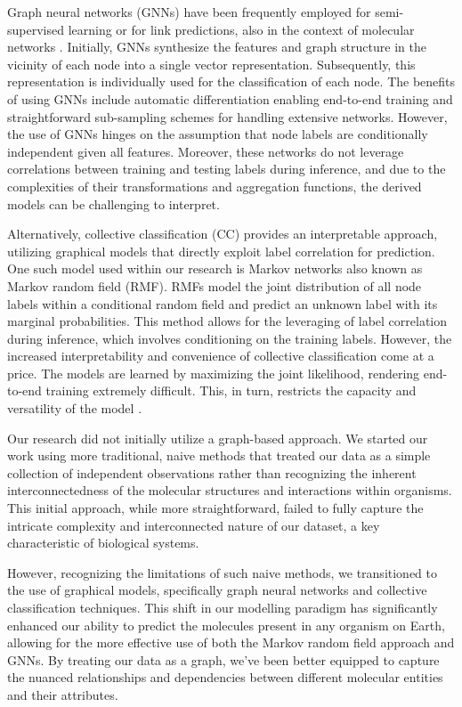 \documentclass[
11pt, %
oneside, %
english, %
singlespacing, %
headsepline, %
chapterinoneline, %
]{MastersDoctoralThesis} %
\begin{document}
Graph neural networks (GNNs) \cite{wuGraphNeuralNetworks2022} have been frequently employed for semi-supervised learning or for link predictions, also in the context of molecular networks \cite{oyetundeBoostGAPFILLImprovingFidelity2017}. Initially, GNNs synthesize the features and graph structure in the vicinity of each node into a single vector representation. Subsequently, this representation is individually used for the classification of each node. The benefits of using GNNs include automatic differentiation enabling end-to-end training and straightforward sub-sampling schemes for handling extensive networks. However, the use of GNNs hinges on the assumption that node labels are conditionally independent given all features. Moreover, these networks do not leverage correlations between training and testing labels during inference, and due to the complexities of their transformations and aggregation functions, the derived models can be challenging to interpret.

Alternatively, collective classification (CC) \cite{senCollectiveClassificationNetwork2008} provides an interpretable approach, utilizing graphical models that directly exploit label correlation for prediction. One such model used within our research is Markov networks also known as Markov random field (RMF). RMFs model the joint distribution of all node labels within a conditional random field and predict an unknown label with its marginal probabilities. This method allows for the leveraging of label correlation during inference, which involves conditioning on the training labels. However, the increased interpretability and convenience of collective classification come at a price. The models are learned by maximizing the joint likelihood, rendering end-to-end training extremely difficult. This, in turn, restricts the capacity and versatility of the model \cite{jiaGraphBeliefPropagation2021}.

Our research did not initially utilize a graph-based approach. We started our work using more traditional, naive methods that treated our data as a simple collection of independent observations rather than recognizing the inherent interconnectedness of the molecular structures and interactions within organisms. This initial approach, while more straightforward, failed to fully capture the intricate complexity and interconnected nature of our dataset, a key characteristic of biological systems.

However, recognizing the limitations of such naive methods, we transitioned to the use of graphical models, specifically graph neural networks and collective classification techniques. This shift in our modelling paradigm has significantly enhanced our ability to predict the molecules present in any organism on Earth, allowing for the more effective use of both the Markov random field approach and GNNs. By treating our data as a graph, we've been better equipped to capture the nuanced relationships and dependencies between different molecular entities and their attributes.
\end{document}
